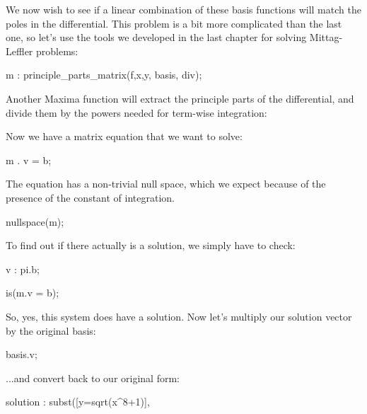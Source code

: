 We now wish to see if a linear combination of these basis functions will
match the poles in the differential.  This problem is a bit more complicated
than the last one, so let's use the tools we developed in the
last chapter for solving Mittag-Leffler problems:

\begin{maximablock}
m : principle_parts_matrix(f,x,y, basis, div);
\end{maximablock}

Another Maxima function will extract the principle parts of the
differential, and divide them by the powers needed for term-wise
integration:


Now we have a matrix equation that we want to solve:

\begin{maximablock}
m . v = b;
\end{maximablock}

The equation has a non-trivial null space, which we expect because
of the presence of the constant of integration.

\begin{maximablock}
nullspace(m);
\end{maximablock}

To find out if there actually is a solution, we simply have to check:

\begin{maximablock}
v : pi.b;

is(m.v = b);
\end{maximablock}

So, yes, this system does have a solution.  Now let's multiply our
solution vector by the original basis:

\begin{maximablock}
basis.v;
\end{maximablock}

...and convert back to our original form:

\begin{maximablock}
solution : subst([y=sqrt(x^8+1)], %
\end{maximablock}

